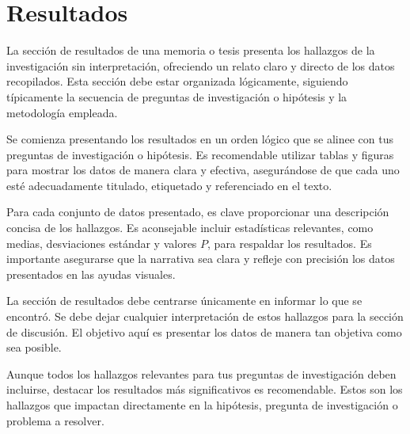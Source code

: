 \section{Resultados}

La sección de resultados de una memoria o tesis presenta los hallazgos de la investigación sin interpretación, ofreciendo un relato claro y directo de los datos recopilados. Esta sección debe estar organizada lógicamente, siguiendo típicamente la secuencia de preguntas de investigación o hipótesis y la metodología empleada. 

Se comienza presentando los resultados en un orden lógico que se alinee con tus preguntas de investigación o hipótesis. Es recomendable utilizar tablas y figuras para mostrar los datos de manera clara y efectiva, asegurándose de que cada uno esté adecuadamente titulado, etiquetado y referenciado en el texto.

Para cada conjunto de datos presentado, es clave proporcionar una descripción concisa de los hallazgos. Es aconsejable incluir estadísticas relevantes, como medias, desviaciones estándar y valores $P$, para respaldar los resultados. Es importante asegurarse que la narrativa sea clara y refleje con precisión los datos presentados en las ayudas visuales.

La sección de resultados debe centrarse únicamente en informar lo que se encontró. Se debe dejar cualquier interpretación de estos hallazgos para la sección de discusión. El objetivo aquí es presentar los datos de manera tan objetiva como sea posible.

Aunque todos los hallazgos relevantes para tus preguntas de investigación deben incluirse, destacar los resultados más significativos es recomendable. Estos son los hallazgos que impactan directamente en la hipótesis, pregunta de investigación o problema a resolver.





